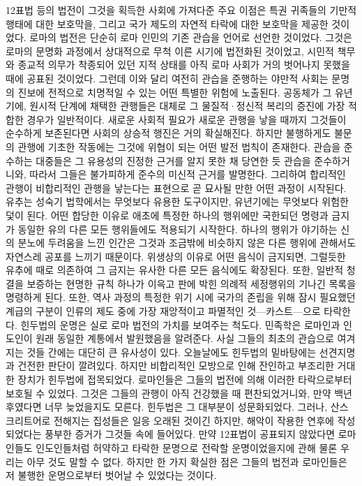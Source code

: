 12표법 등의 법전이 그것을 획득한 사회에 가져다준 주요 이점은
특권 귀족들의 기만적 행태에 대한 보호막을,
그리고 국가 제도의 자연적 타락에 대한 보호막을 제공한 것이었다.
로마의 법전은 단순히 로마 인민의 기존 관습을 언어로 선언한 것이었다.
그것은 로마의 문명화 과정에서 상대적으로 무척 이른 시기에 법전화된 것이었고,
시민적 책무와 종교적 의무가 착종되어 있던 지적 상태를 아직
로마 사회가 거의 벗어나지 못했을 때에 공표된 것이었다.
그런데 이와 달리 여전히 관습을 준행하는 야만적 사회는
문명의 진보에 전적으로 치명적일 수 있는 어떤 특별한 위험에 노출된다.
공동체가 그 유년기에, 원시적 단계에 채택한 관행들은
대체로 그 물질적^^b7정신적 복리의 증진에 가장 적합한 경우가 일반적이다.
새로운 사회적 필요가 새로운 관행을 낳을 때까지 그것들이 순수하게 보존된다면
사회의 상승적 행진은 거의 확실해진다.
하지만 불행하게도 불문의 관행에 기초한 작동에는 그것에 위협이 되는
어떤 발전 법칙이 존재한다.
관습을 준수하는 대중들은 그 유용성의 진정한 근거를 알지 못한 채
당연한 듯 관습을 준수하거니와,
따라서 그들은 불가피하게 준수의 미신적 근거를 발명한다.
그리하여 합리적인 관행이 비합리적인 관행을 낳는다는 표현으로
곧 묘사될 만한 어떤 과정이 시작된다.
유추는 성숙기 법학에서는 무엇보다 유용한 도구이지만,
유년기에는 무엇보다 위험한 덫이 된다.
어떤 합당한 이유로 애초에 특정한 하나의 행위에만 국한되던 명령과 금지가
동일한 유의 다른 모든 행위들에도 적용되기 시작한다.
하나의 행위가 야기하는 신의 분노에 두려움을 느낀 인간은
그것과 조금밖에 비슷하지 않은 다른 행위에 관해서도
자연스레 공포를 느끼기 때문이다.
위생상의 이유로 어떤 음식이 금지되면,
그럴듯한 유추에 때로 의존하여
그 금지는 유사한 다른 모든 음식에도 확장된다.
또한, 일반적 청결을 보증하는 현명한 규칙 하나가 이윽고
판에 박힌 의례적 세정행위의 기나긴 목록을 명령하게 된다.
또한, 역사 과정의 특정한 위기 시에 국가의 존립을 위해 잠시 필요했던
계급의 구분이 인류의 제도 중에 가장 재앙적이고 파멸적인 것---카스트---으로
타락한다.
힌두법의 운명은 실로 로마 법전의 가치를 보여주는 척도다.
민족학은 로마인과 인도인이 원래 동일한 계통에서 발원했음을 알려준다.
사실 그들의 최초의 관습으로 여겨지는 것들 간에는
대단히 큰 유사성이 있다.
오늘날에도 힌두법의 밑바탕에는 선견지명과 건전한 판단이 깔려있다.
하지만 비합리적인 모방으로 인해 잔인하고 부조리한 거대한 장치가
힌두법에 접목되었다.
로마인들은 그들의 법전에 의해 이러한 타락으로부터 보호될 수 있었다.
그것은 그들의 관행이 아직 건강했을 때 편찬되었거니와,
만약 백년 후였다면 너무 늦었을지도 모른다.
힌두법은 그 대부분이 성문화되었다.
그러나,
산스크리트어로 전해지는 집성들은 일응 오래된 것이긴 하지만,
해악이 작용한 연후에 작성되었다는 풍부한 증거가 그것들 속에 들어있다.
만약 12표법이 공표되지 않았다면 로마인들도 인도인들처럼
허약하고 타락한 문명으로 전락할 운명이었을지에 관해
물론 우리는 아무 것도 말할 수 없다.
하지만 한 가지 확실한 점은 그들의 법전과 
로마인들은 저 불행한 운명으로부터 벗어날 수 있었다는 것이다.


